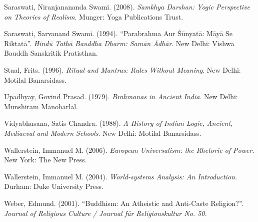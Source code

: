 \begin{thebibliography}{99}
  Saraswati, Niranjanananda Swami. (2008). \textit{Samkhya Darshan: Yogic Perspective on Theories of Realism}. Munger: Yoga Publications Trust.

  Saraswati, Sarvanand Swami. (1994). “Parabrahma Aur Śūnyatā: Māyā Se Riktatā”. \textit{Hindū Tathā Bauddha Dharm: Samān Ādhār}. New Delhi: Vishwa Bauddh Sanskritik Pratisthan.

  Staal, Frits. (1996). \textit{Ritual and Mantras: Rules Without Meaning}. New Delhi: Motilal Banarsidass.

  Upadhyay, Govind Prasad. (1979). \textit{Brahmanas in Ancient India}. New Delhi: Munshiram Manoharlal.

  Vidyabhusana, Satis Chandra. (1988). \textit{A History of Indian Logic, Ancient, Mediaeval and Modern Schools}. New Delhi: Motilal Banarsidass.

  Wallerstein, Immanuel M. (2006). \textit{European Universalism: the Rhetoric of Power}. New York: The New Press.

  Wallerstein, Immanuel M. (2004). \textit{World-systems Analysis: An Introduction}. Durham: Duke University Press.

  Weber, Edmund. (2001). “Buddhism: An Atheistic and Anti-Caste Religion?”. \textit{Journal of Religious Culture / Journal für Religionskultur No. 50.}

 \end{thebibliography}

\theendnotes


